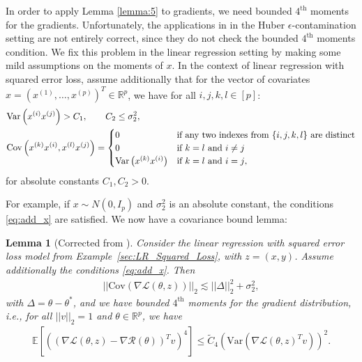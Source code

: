\documentclass{article}
\newtheorem{lemma}{Lemma}
\begin{document}
In order to apply Lemma \ref{lemma:5} to gradients, we need bounded $4^{\text{th}}$ moments for the gradients. Unfortunately, the applications in \cite{RE} in the Huber $\epsilon$-contamination setting are not entirely correct, since they do not check the bounded $4^{\text{th}}$ moments condition. We fix this problem in the linear regression setting by making some mild assumptions on the moments of $x$. In the context of linear regression with squared error loss, assume additionally that for the vector of covariates $x = \left(x^{(1)}, \dots, x^{(p)}\right)^T \in \mathbb{R}^p$, we have for all $i, j, k, l \in [p]$:
\begin{align}
\label{eq:add_x}
&\mathrm{Var}\left(x^{(i)}x^{(j)}\right) > C_1, \qquad C_2 \leq \sigma_2^2, \notag\\
& \mathrm{Cov}\left(x^{(k)}x^{(i)}, x^{(l)}x^{(j)}\right) = \begin{cases} 
      0 & \text{if any two indexes from $\{i, j, k, l\}$ are distinct}
      \\
      0 & \text{if $k = l$ and $i \neq j$}
      \\
      \mathrm{Var}\left(x^{(k)}x^{(i)}\right) & \text{if $k = l$ and $i = j$},
   \end{cases}
\end{align}
for absolute constants $C_1, C_2 > 0$.

For example, if $x \sim N\left(0, I_p\right)$ and $\sigma_2^2$ is an absolute constant, the conditions \eqref{eq:add_x} are satisfied. We now have a covariance bound lemma:

\begin{lemma}[Corrected from \cite{RE}]
\label{lemma:covglm}
Consider the linear regression with squared error loss model from Example~\ref{sec:LR_Squared_Loss}, with $z = (x, y)$. Assume additionally the conditions \eqref{eq:add_x}.
Then
\begin{align*}
||\mathrm{\mathrm{Cov}}(\nabla \mathcal{L}(\theta, z))||_2 \lesssim ||\Delta||_2^2 + \sigma_2^2,
\end{align*}
with $\Delta = \theta - \theta^*$, and we have bounded $4^{\text{th}}$ moments for the gradient distribution, i.e., for all $||v||_2 = 1$ and $\theta \in \mathbb{R}^p$, we have
\begin{align*}
\mathbb{E}\left[\left((\nabla \mathcal{L}(\theta, z) - \nabla\mathcal{R}(\theta))^Tv\right)^4\right] \leq  \widetilde{C}_4(\mathrm{Var}(\nabla \mathcal{L}(\theta, z)^Tv))^2.
\end{align*}
\end{lemma}
\end{document}

